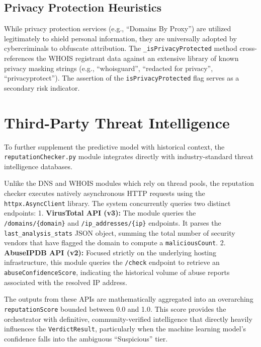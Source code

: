 \subsection{Privacy Protection
Heuristics}\label{privacy-protection-heuristics}

While privacy protection services (e.g., ``Domains By Proxy'') are
utilized legitimately to shield personal information, they are
universally adopted by cybercriminals to obfuscate attribution. The
\texttt{\_isPrivacyProtected} method cross-references the WHOIS
registrant data against an extensive library of known privacy masking
strings (e.g., ``whoisguard'', ``redacted for privacy'',
``privacyprotect''). The assertion of the \texttt{isPrivacyProtected}
flag serves as a secondary risk indicator.

\section{Third-Party Threat
Intelligence}\label{third-party-threat-intelligence}

To further supplement the predictive model with historical context, the
\texttt{reputationChecker.py} module integrates directly with
industry-standard threat intelligence databases.

Unlike the DNS and WHOIS modules which rely on thread pools, the
reputation checker executes natively asynchronous HTTP requests using
the \texttt{httpx.AsyncClient} library. The system concurrently queries
two distinct endpoints: 1. \textbf{VirusTotal API (v3):} The module
queries the \texttt{/domains/\{domain\}} and
\texttt{/ip\_addresses/\{ip\}} endpoints. It parses the
\texttt{last\_analysis\_stats} JSON object, summing the total number of
security vendors that have flagged the domain to compute a
\texttt{maliciousCount}. 2. \textbf{AbuseIPDB API (v2):} Focused
strictly on the underlying hosting infrastructure, this module queries
the \texttt{/check} endpoint to retrieve an
\texttt{abuseConfidenceScore}, indicating the historical volume of abuse
reports associated with the resolved IP address.

The outputs from these APIs are mathematically aggregated into an
overarching \texttt{reputationScore} bounded between 0.0 and 1.0. This
score provides the orchestrator with definitive, community-verified
intelligence that directly heavily influences the
\texttt{VerdictResult}, particularly when the machine learning model's
confidence falls into the ambiguous ``Suspicious'' tier.



